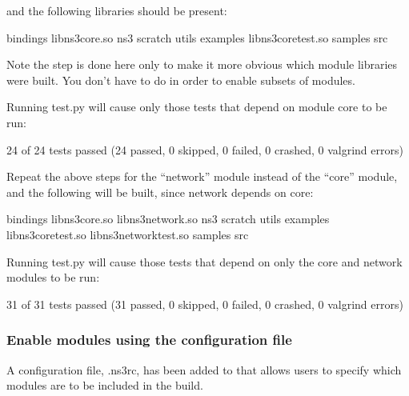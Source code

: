 \documentclass[letterpaper,10pt,english]{sphinxmanual}
\renewcommand{\sphinxcode}[1]{\texttt{\small{#1}}}
\begin{document}
and the following libraries should be present:

\begin{sphinxVerbatim}[commandchars=\\\{\}]
bindings  libns3\PYGZhy{}core.so       ns3      scratch  utils
examples  libns3\PYGZhy{}core\PYGZhy{}test.so  samples  src
\end{sphinxVerbatim}

Note the \sphinxcode{} step is done here only to make it more obvious which module libraries were built.  You don’t have to do \sphinxcode{} in order to enable subsets of modules.

Running test.py will cause only those tests that depend on module core to be run:

\begin{sphinxVerbatim}[commandchars=\\\{\}]
24 of 24 tests passed (24 passed, 0 skipped, 0 failed, 0 crashed, 0 valgrind errors)
\end{sphinxVerbatim}

Repeat the above steps for the “network” module instead of the “core” module, and the following will be built, since network depends on core:

\begin{sphinxVerbatim}[commandchars=\\\{\}]
bindings  libns3\PYGZhy{}core.so       libns3\PYGZhy{}network.so       ns3      scratch  utils
examples  libns3\PYGZhy{}core\PYGZhy{}test.so  libns3\PYGZhy{}network\PYGZhy{}test.so  samples  src
\end{sphinxVerbatim}

Running test.py will cause those tests that depend on only the core and network modules to be run:

\begin{sphinxVerbatim}[commandchars=\\\{\}]
31 of 31 tests passed (31 passed, 0 skipped, 0 failed, 0 crashed, 0 valgrind errors)
\end{sphinxVerbatim}


\subsubsection{Enable modules using the  configuration file}
\label{\detokenize{enable-modules:enable-modules-using-the-ns3-configuration-file}}
A configuration file, .ns3rc, has been added to  that allows users to specify which modules are to be included in the build.
\end{document}
